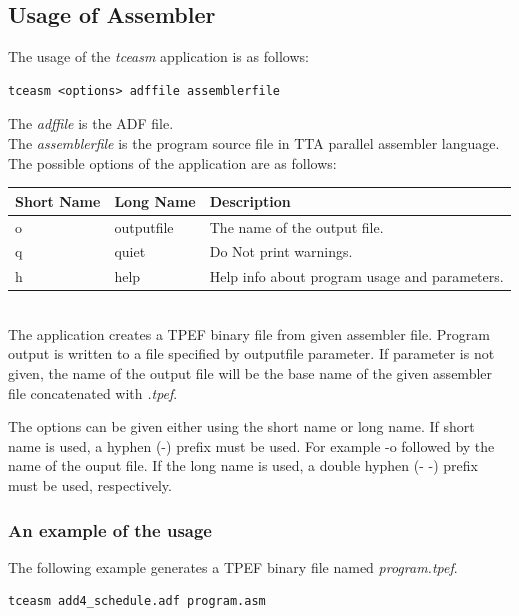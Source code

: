 \documentclass[a4paper,twoside]{tceusermanual}
\begin{document}
\subsection{Usage of Assembler}

The usage of the \emph{tceasm} application is as follows:

\begin{verbatim}
tceasm <options> adffile assemblerfile
\end{verbatim}

The \emph{adffile} is the ADF file.\\
The \emph{assemblerfile} is the program source file in TTA parallel assembler
language.\\

The possible options of the application are as follows:\\

\begin{tabular}{p{}p{}
                p{}}
\textbf{Short Name} &\textbf{Long Name} &\textbf{Description} \\
\hline
o & outputfile  & The name of the output file.\\
q & quiet       & Do Not print warnings.\\
h & help        & Help info about program usage and parameters.\\
\end{tabular}\\

The application creates a TPEF binary file from given assembler file. 
Program output is written to a file specified by outputfile parameter. If
parameter is not given, the name of the output file will be the base name of
the given assembler file concatenated with \emph{.tpef}.

The options can be given either using the short name or long name. If
short name is used, a hyphen (-) prefix must be used. For example -o
followed by the name of the ouput file. If the long name is used, a
double hyphen (- -) prefix must be used, respectively.

\subsubsection{An example of the usage}

The following example generates a TPEF binary file named \emph{program.tpef}.
 
\begin{verbatim}
tceasm add4_schedule.adf program.asm
\end{verbatim}
\end{document}
